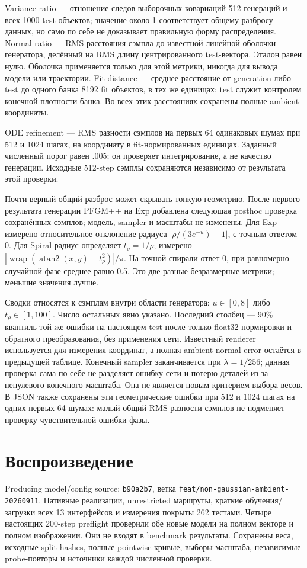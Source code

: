 \documentclass[10pt,a4paper]{article}
\begin{document}
Variance ratio --- отношение следов выборочных ковариаций 512 генераций и
всех 1000 test объектов; значение около 1 соответствует общему разбросу данных,
но само по себе не доказывает правильную форму распределения. Normal ratio ---
RMS расстояния сэмпла до известной линейной оболочки генератора, делённый на
RMS длину центрированного test-вектора. Эталон равен нулю. Оболочка применяется
только для этой метрики, никогда для вывода модели или траектории.
Fit distance --- среднее расстояние от generation либо test до одного
банка 8192 fit объектов, в тех же единицах; test служит контролем конечной
плотности банка. Во всех этих расстояниях сохранены полные ambient координаты.

ODE refinement --- RMS разности сэмплов на первых 64 одинаковых шумах при
512 и 1024 шагах, на координату в fit-нормированных единицах. Заданный
численный порог равен .005; он проверяет интегрирование, а не качество генерации.
Исходные 512-step сэмплы сохраняются независимо от результата этой проверки.


Почти верный общий разброс может скрывать тонкую геометрию. После первого
результата генерации PFGM++ на Exp добавлена следующая posthoc проверка
сохранённых сэмплов; модель, sampler и масштабы не изменены. Для Exp измерено
относительное отклонение радиуса $|\rho/(3e^{-u})-1|$, с точным ответом 0.
Для Spiral радиус определяет $t_\rho=1/\rho$; измерено
$|\operatorname{wrap}(\operatorname{atan2}(x,y)-t_\rho^2)|/\pi$.
На точной спирали ответ 0, при равномерно случайной фазе среднее равно 0.5.
Это две разные безразмерные метрики; меньшие значения лучше.

Сводки относятся к сэмплам внутри области генератора: $u\in[0,8]$ либо
$t_\rho\in[1,100]$. Число остальных явно указано. Последний столбец ---
90\% квантиль той же ошибки на настоящем test после только float32
нормировки и обратного преобразования, без применения сети. Известный renderer
используется для измерения координат, а полная ambient normal error остаётся
в предыдущей таблице. Конечный sampler заканчивается при $\lambda=1/256$;
данная проверка сама по себе не разделяет ошибку сети и потерю деталей из-за
ненулевого конечного масштаба. Она не является новым критерием выбора весов.
В JSON также сохранены эти геометрические ошибки при 512 и 1024 шагах
на одних первых 64 шумах: малый общий RMS разности сэмплов не подменяет
проверку чувствительной ошибки фазы.



\section*{Воспроизведение}
Producing model/config source: \texttt{b90a2b7}, ветка
\texttt{feat/non-gaussian-ambient-20260911}. Нативные реализации, unrestricted
маршруты, краткие обучения/загрузки всех 13 интерфейсов и измерения покрыты
262 тестами. Четыре настоящих 200-step preflight проверили обе новые модели
на полном векторе и полном изображении. Они не входят в benchmark результаты.
Сохранены веса, исходные split hashes, полные pointwise кривые, выборы масштаба,
независимые probe-повторы и источники каждой численной проверки.
\end{document}
